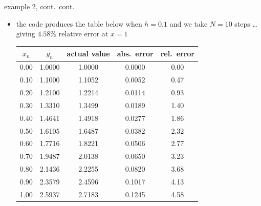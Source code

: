 \documentclass[colorlinks]{beamer}
\begin{document}
\begin{frame}{example 2, cont.~cont.}

\begin{itemize}
\item the code produces the table below when $h=0.1$ and we take $N=10$ steps \dots giving $4.58\%$ relative error at $x=1$

\medskip
\footnotesize
\begin{tabular}{ccccc}
$x_n$ & $y_n$ & actual value & abs.~error & rel.~error \\ \hline
0.00 & 1.0000 & 1.0000 & 0.0000 & 0.00 \\
0.10 & 1.1000 & 1.1052 & 0.0052 & 0.47 \\
0.20 & 1.2100 & 1.2214 & 0.0114 & 0.93 \\
0.30 & 1.3310 & 1.3499 & 0.0189 & 1.40 \\
0.40 & 1.4641 & 1.4918 & 0.0277 & 1.86 \\
0.50 & 1.6105 & 1.6487 & 0.0382 & 2.32 \\
0.60 & 1.7716 & 1.8221 & 0.0506 & 2.77 \\
0.70 & 1.9487 & 2.0138 & 0.0650 & 3.23 \\
0.80 & 2.1436 & 2.2255 & 0.0820 & 3.68 \\
0.90 & 2.3579 & 2.4596 & 0.1017 & 4.13 \\
1.00 & 2.5937 & 2.7183 & 0.1245 & 4.58
\end{tabular}
\end{itemize}
\end{frame}
\end{document}
